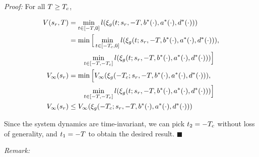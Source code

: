 \textit{Proof:} For all $T \ge T_c$,
   
   \begin{equation}
   \begin{aligned}
   V(s_r, T) &= \min_{t \in [-T, 0]} l(\xi_g(t; s_r, -T, b^*(\cdot), a^*(\cdot), d^*(\cdot))) \\
   &= \min \Big[ \min_{t \in [-T_c, 0]} l(\xi_g(t; s_r, -T, b^*(\cdot), a^*(\cdot), d^*(\cdot))), \\
   &\qquad\min_{t \in [-T, -T_c]} l(\xi_g(t; s_r, -T, b^*(\cdot), a^*(\cdot), d^*(\cdot))) \Big] \\
   V_\infty(s_r) &= \min \Big[ V_\infty(\xi_g(-T_c; s_r, -T, b^*(\cdot), a^*(\cdot), d^*(\cdot))), \\
   &\qquad\min_{t \in [-T, -T_c]} l(\xi_g(t; s_r, -T, b^*(\cdot), a^*(\cdot), d^*(\cdot))) \Big] \\
   V_\infty(s_r) &\le V_\infty(\xi_g(-T_c; s_r, -T, b^*(\cdot), a^*(\cdot), d^*(\cdot))) \\
   \end{aligned}
   \end{equation}
   
   Since the system dynamics are time-invariant, we can pick $t_2 = -T_c$ without loss of generality, and $t_1 = -T$ to obtain the desired result. \hfill $\blacksquare$
 
 \textit{Remark:} 
